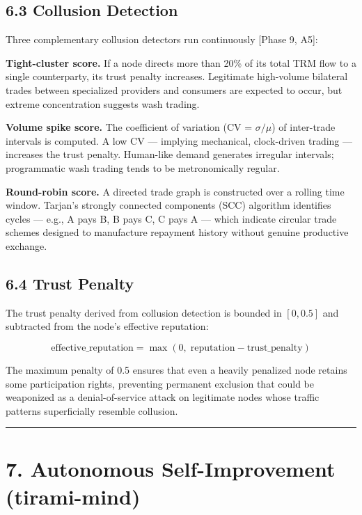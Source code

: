 \documentclass[
  11pt,
]{article}
\begin{document}
\subsection{6.3 Collusion Detection}\label{collusion-detection}

Three complementary collusion detectors run continuously {[}Phase 9,
A5{]}:

\textbf{Tight-cluster score.} If a node directs more than 20\% of its
total TRM flow to a single counterparty, its trust penalty increases.
Legitimate high-volume bilateral trades between specialized providers
and consumers are expected to occur, but extreme concentration suggests
wash trading.

\textbf{Volume spike score.} The coefficient of variation (CV =
\(\sigma / \mu\)) of inter-trade intervals is computed. A low CV ---
implying mechanical, clock-driven trading --- increases the trust
penalty. Human-like demand generates irregular intervals; programmatic
wash trading tends to be metronomically regular.

\textbf{Round-robin score.} A directed trade graph is constructed over a
rolling time window. Tarjan's strongly connected components (SCC)
algorithm identifies cycles --- e.g., A pays B, B pays C, C pays A ---
which indicate circular trade schemes designed to manufacture repayment
history without genuine productive exchange.

\subsection{6.4 Trust Penalty}\label{trust-penalty}

The trust penalty derived from collusion detection is bounded in
\([0, 0.5]\) and subtracted from the node's effective reputation:

\[\text{effective\_reputation} = \max(0,\; \text{reputation} - \text{trust\_penalty})\]

The maximum penalty of 0.5 ensures that even a heavily penalized node
retains some participation rights, preventing permanent exclusion that
could be weaponized as a denial-of-service attack on legitimate nodes
whose traffic patterns superficially resemble collusion.

\begin{center}\rule{0.5\linewidth}{0.5pt}\end{center}

\section{7. Autonomous Self-Improvement
(tirami-mind)}\label{autonomous-self-improvement-tirami-mind}
\end{document}
